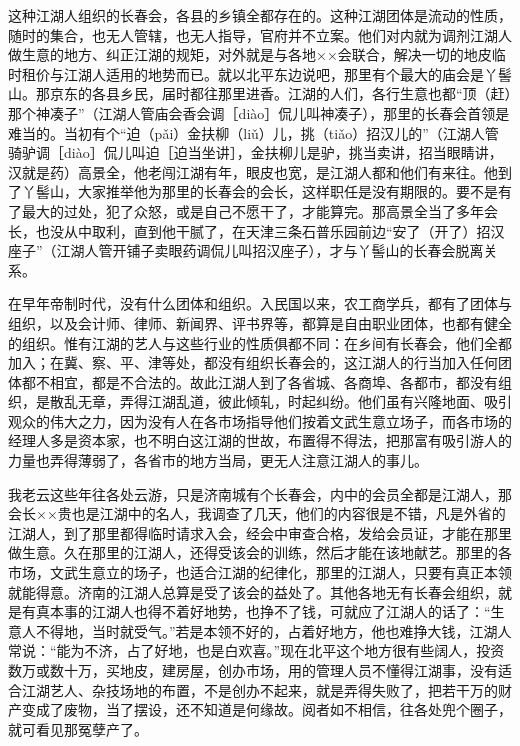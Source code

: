 \documentclass[12pt,UTF8]{ctexbook}
\begin{document}
这种江湖人组织的长春会，各县的乡镇全都存在的。这种江湖团体是流动的性质，随时的集合，也无人管辖，也无人指导，官府并不立案。他们对内就为调剂江湖人做生意的地方、纠正江湖的规矩，对外就是与各地××会联合，解决一切的地皮临时租价与江湖人适用的地势而已。就以北平东边说吧，那里有个最大的庙会是丫髻山。那京东的各县乡民，届时都往那里进香。江湖的人们，各行生意也都“顶（赶）那个神凑子”（江湖人管庙会香会调［diào］侃儿叫神凑子），那里的长春会首领是难当的。当初有个“迫（pǎi）金扶柳（liǔ）儿，挑（tiǎo）招汉儿的”（江湖人管骑驴调［diào］侃儿叫迫［迫当坐讲］，金扶柳儿是驴，挑当卖讲，招当眼睛讲，汉就是药）高景全，他老闯江湖有年，眼皮也宽，是江湖人都和他们有来往。他到了丫髻山，大家推举他为那里的长春会的会长，这样职任是没有期限的。要不是有了最大的过处，犯了众怒，或是自己不愿干了，才能算完。那高景全当了多年会长，也没从中取利，直到他干腻了，在天津三条石普乐园前边“安了（开了）招汉座子”（江湖人管开铺子卖眼药调侃儿叫招汉座子），才与丫髻山的长春会脱离关系。

在早年帝制时代，没有什么团体和组织。入民国以来，农工商学兵，都有了团体与组织，以及会计师、律师、新闻界、评书界等，都算是自由职业团体，也都有健全的组织。惟有江湖的艺人与这些行业的性质俱都不同：在乡间有长春会，他们全都加入；在冀、察、平、津等处，都没有组织长春会的，这江湖人的行当加入任何团体都不相宜，都是不合法的。故此江湖人到了各省城、各商埠、各都市，都没有组织，是散乱无章，弄得江湖乱道，彼此倾轧，时起纠纷。他们虽有兴隆地面、吸引观众的伟大之力，因为没有人在各市场指导他们按着文武生意立场子，而各市场的经理人多是资本家，也不明白这江湖的世故，布置得不得法，把那富有吸引游人的力量也弄得薄弱了，各省市的地方当局，更无人注意江湖人的事儿。

我老云这些年往各处云游，只是济南城有个长春会，内中的会员全都是江湖人，那会长××贵也是江湖中的名人，我调查了几天，他们的内容很是不错，凡是外省的江湖人，到了那里都得临时请求入会，经会中审查合格，发给会员证，才能在那里做生意。久在那里的江湖人，还得受该会的训练，然后才能在该地献艺。那里的各市场，文武生意立的场子，也适合江湖的纪律化，那里的江湖人，只要有真正本领就能得意。济南的江湖人总算是受了该会的益处了。其他各地无有长春会组织，就是有真本事的江湖人也得不着好地势，也挣不了钱，可就应了江湖人的话了：“生意人不得地，当时就受气。”若是本领不好的，占着好地方，他也难挣大钱，江湖人常说：“能为不济，占了好地，也是白欢喜。”现在北平这个地方很有些阔人，投资数万或数十万，买地皮，建房屋，创办市场，用的管理人员不懂得江湖事，没有适合江湖艺人、杂技场地的布置，不是创办不起来，就是弄得失败了，把若干万的财产变成了废物，当了摆设，还不知道是何缘故。阅者如不相信，往各处兜个圈子，就可看见那冤孽产了。
\end{document}
